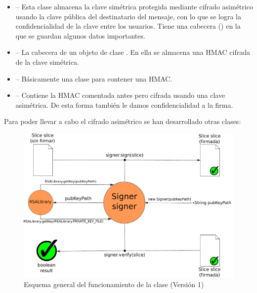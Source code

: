 \begin{itemize}
  \item {} -- Esta clase almacena la clave simétrica protegida mediante cifrado asimétrico usando la clave pública del destinatario del mensaje, con lo que se logra la confidencialidad de la clave entre los usuarios. Tiene una cabecera () en la que se guardan algunos datos importantes.

  \item {} -- La cabecera de un objeto de clase . En ella se almacena una HMAC cifrada de la clave simétrica.

  \item {} -- Básicamente una clase para contener una HMAC.

  \item {} -- Contiene la HMAC comentada antes pero cifrada usando una clave asimétrica. De esta forma también le damos confidencialidad a la firma.
\end{itemize}

Para poder llevar a cabo el cifrado asimétrico se han desarrollado otras clases:

\begin{figure}[!htb]
  \centering
  \includegraphics[scale=0.5]{Figures/Signer_1}
  \decoRule
  \caption[ (Versión 1)]{Esquema general del funcionamiento de la clase  (Versión 1)}
  \label{fig:Signer_1}
\end{figure}

